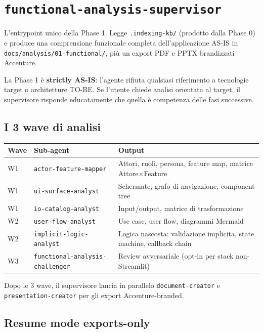 \documentclass[12pt,a4paper,twoside]{book}
\begin{document}
\section{\texttt{functional-analysis-supervisor}}

L'entrypoint unico della Phase 1. Legge \texttt{.indexing-kb/} (prodotto dalla Phase 0) e produce una comprensione funzionale completa dell'applicazione AS-IS in \texttt{docs/analysis/01-functional/}, più un export PDF e PPTX brandizzati Accenture.

La Phase 1 è \textbf{strictly AS-IS}: l'agente rifiuta qualsiasi riferimento a tecnologie target o architetture TO-BE. Se l'utente chiede analisi orientata al target, il supervisore risponde educatamente che quella è competenza delle fasi successive.

\subsection{I 3 wave di analisi}

\begin{center}
\begin{longtable}{llp{7cm}}
\toprule
\textbf{Wave} & \textbf{Sub-agent} & \textbf{Output} \\
\midrule
\endhead
W1 & \texttt{actor-feature-mapper} & Attori, ruoli, persona, feature map, matrice Attore×Feature \\
W1 & \texttt{ui-surface-analyst} & Schermate, grafo di navigazione, component tree \\
W1 & \texttt{io-catalog-analyst} & Input/output, matrice di trasformazione \\
W2 & \texttt{user-flow-analyst} & Use case, user flow, diagrammi Mermaid \\
W2 & \texttt{implicit-logic-analyst} & Logica nascosta: validazione implicita, state machine, callback chain \\
W3 & \texttt{functional-analysis-challenger} & Review avversariale (opt-in per stack non-Streamlit) \\
\bottomrule
\end{longtable}
\end{center}

Dopo le 3 wave, il supervisore lancia in parallelo \texttt{document-creator} e \texttt{presentation-creator} per gli export Accenture-branded.

\subsection{Resume mode exports-only}
\end{document}
